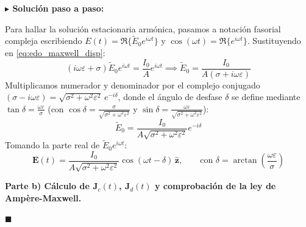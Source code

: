 \documentclass[11pt,a4paper]{book}
\newenvironment{solucion}{%
    \par\medskip\noindent\textbf{\color{blue!65!black}\Large $\blacktriangleright$ Solución paso a paso:}\par\medskip
}{%
    \hfill$\blacksquare$\par\bigskip
}
\newcommand{\zhat}{\hat{\bm{z}}}
\newcommand{\Evec}{\bm{E}}
\newcommand{\Jvec}{\bm{J}}
\begin{document}
\begin{solucion}
Para hallar la solución estacionaria armónica, pasamos a notación fasorial compleja escribiendo $E(t) = \Re\big\{\tilde{E}_0 e^{i\omega t}\big\}$ y $\cos(\omega t) = \Re\big\{e^{i\omega t}\big\}$. Sustituyendo en \eqref{eq:edo_maxwell_disp}:
\begin{equation}
    (i\omega\varepsilon + \sigma) \tilde{E}_0 e^{i\omega t} = \frac{I_0}{A} e^{i\omega t} \implies \tilde{E}_0 = \frac{I_0}{A(\sigma + i\omega\varepsilon)}
\end{equation}
Multiplicamos numerador y denominador por el complejo conjugado $(\sigma - i\omega\varepsilon) = \sqrt{\sigma^2 + \omega^2\varepsilon^2}\,e^{-i\delta}$, donde el ángulo de desfase $\delta$ se define mediante $\tan\delta = \frac{\omega\varepsilon}{\sigma}$ (con $\cos\delta = \frac{\sigma}{\sqrt{\sigma^2+\omega^2\varepsilon^2}}$ y $\sin\delta = \frac{\omega\varepsilon}{\sqrt{\sigma^2+\omega^2\varepsilon^2}}$):
\begin{equation}
    \tilde{E}_0 = \frac{I_0}{A\sqrt{\sigma^2 + \omega^2\varepsilon^2}} e^{-i\delta}
\end{equation}
Tomando la parte real de $\tilde{E}_0 e^{i\omega t}$:
\begin{equation}
    \Evec(t) = \frac{I_0}{A\sqrt{\sigma^2 + \omega^2\varepsilon^2}} \cos(\omega t - \delta)\,\zhat, \qquad \text{con } \delta = \arctan\left(\frac{\omega\varepsilon}{\sigma}\right)
\end{equation}

\medskip
\textbf{Parte b) Cálculo de $\Jvec_c(t)$, $\Jvec_d(t)$ y comprobación de la ley de Ampère-Maxwell.}


\end{solucion}
\end{document}
